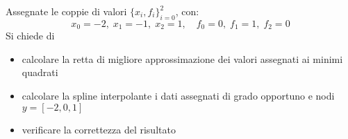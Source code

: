 Assegnate le coppie di valori $\{x_i,f_i \}_{i=0}^2$, con:
\[ x_0=-2, \; x_1=-1, \; x_2=1, \quad f_0=0, \; f_1=1, \; f_2=0 \]
Si chiede di
\begin{itemize}
\item calcolare la retta di
migliore approssimazione dei valori assegnati ai minimi quadrati
\item calcolare la spline interpolante i dati assegnati di grado opportuno e nodi $y=[-2, 0, 1]$
\item verificare la correttezza del risultato
\end {itemize}
